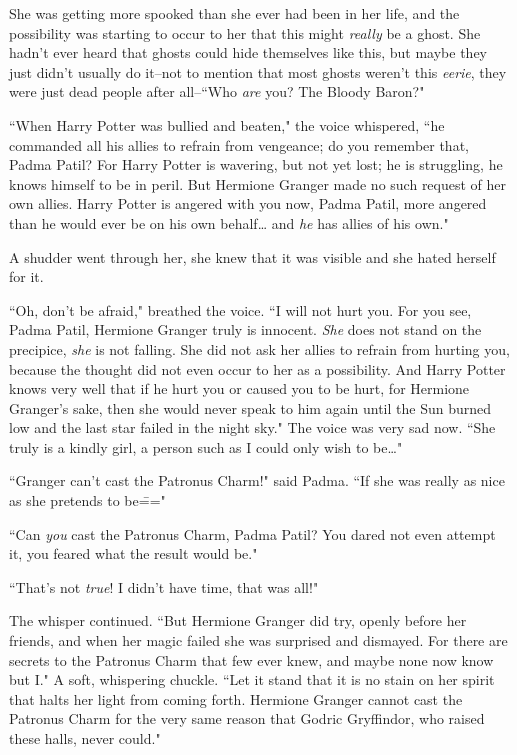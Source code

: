 She was getting more spooked than she ever had been in her life, and the possibility was starting to occur to her that this might \emph{really} be a ghost. She hadn't ever heard that ghosts could hide themselves like this, but maybe they just didn't usually do it\---not to mention that most ghosts weren't this \emph{eerie}, they were just dead people after all\---``Who \emph{are} you? The Bloody Baron?"

``When Harry Potter was bullied and beaten," the voice whispered, ``he commanded all his allies to refrain from vengeance; do you remember that, Padma Patil? For Harry Potter is wavering, but not yet lost; he is struggling, he knows himself to be in peril. But Hermione Granger made no such request of her own allies. Harry Potter is angered with you now, Padma Patil, more angered than he would ever be on his own behalf{\ldots} and \emph{he} has allies of his own."

A shudder went through her, she knew that it was visible and she hated herself for it.

``Oh, don't be afraid," breathed the voice. ``I will not hurt you. For you see, Padma Patil, Hermione Granger truly is innocent. \emph{She} does not stand on the precipice, \emph{she} is not falling. She did not ask her allies to refrain from hurting you, because the thought did not even occur to her as a possibility. And Harry Potter knows very well that if he hurt you or caused you to be hurt, for Hermione Granger's sake, then she would never speak to him again until the Sun burned low and the last star failed in the night sky." The voice was very sad now. ``She truly is a kindly girl, a person such as I could only wish to be{\ldots}"

``Granger can't cast the Patronus Charm!" said Padma. ``If she was really as nice as she pretends to be\==="

``Can \emph{you} cast the Patronus Charm, Padma Patil? You dared not even attempt it, you feared what the result would be."

``That's not \emph{true}! I didn't have time, that was all!"

The whisper continued. ``But Hermione Granger did try, openly before her friends, and when her magic failed she was surprised and dismayed. For there are secrets to the Patronus Charm that few ever knew, and maybe none now know but I." A soft, whispering chuckle. ``Let it stand that it is no stain on her spirit that halts her light from coming forth. Hermione Granger cannot cast the Patronus Charm for the very same reason that Godric Gryffindor, who raised these halls, never could."

